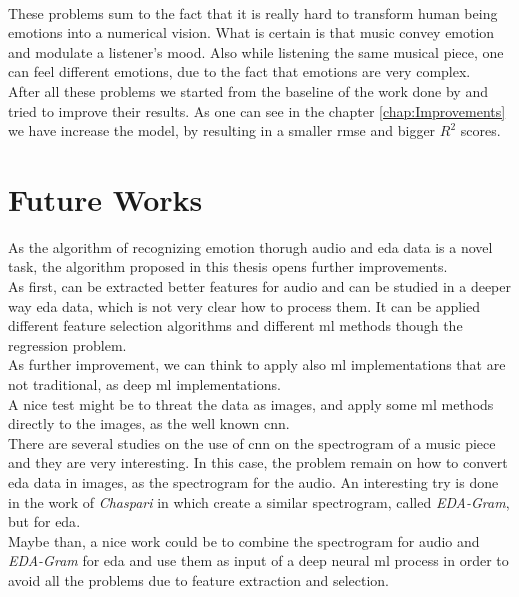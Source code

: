\\ \indent
These problems sum to the fact that it is really hard to transform human being emotions into a numerical vision. What is certain is that music convey emotion and modulate a listener's mood. Also while listening the same musical piece, one can feel different emotions, due to the fact that emotions are very complex.
\\
After all these problems we started from the baseline of the work done by \cite{zhang2018pmemo} and tried to improve their results. As one can see in the chapter \ref{chap:Improvements} we have increase the model, by resulting in a smaller \gls{rmse} and bigger $R^2$ scores.

\section{Future Works}
As the algorithm of recognizing emotion thorugh audio and \gls{eda} data is a novel task, the algorithm proposed in this thesis opens further improvements.
\\ \indent
As first, can be extracted better features for audio and can be studied in a deeper way \gls{eda} data, which is not very clear how to process them. It can be applied different feature selection algorithms and different \gls{ml} methods though the regression problem.
\\ \indent
As further improvement, we can think to apply also \gls{ml} implementations that are not traditional, as deep \gls{ml} implementations.
\\
A nice test might be to threat the data as images, and apply some \gls{ml} methods directly to the images, as the well known \gls{cnn}.
\\
There are several studies on the use of \gls{cnn} on the spectrogram of a music piece and they are very interesting. In this case, the problem remain on how to convert \gls{eda} data in images, as the spectrogram for the audio. An interesting try is done in the work of \textit{Chaspari} in \cite{chaspari2016eda} which create a similar spectrogram, called \textit{EDA-Gram}, but for \gls{eda}.
\\
Maybe than, a nice work could be to combine the spectrogram for audio and \textit{EDA-Gram} for \gls{eda} and use them as input of a deep neural \gls{ml} process in order to avoid all the problems due to feature extraction and selection.